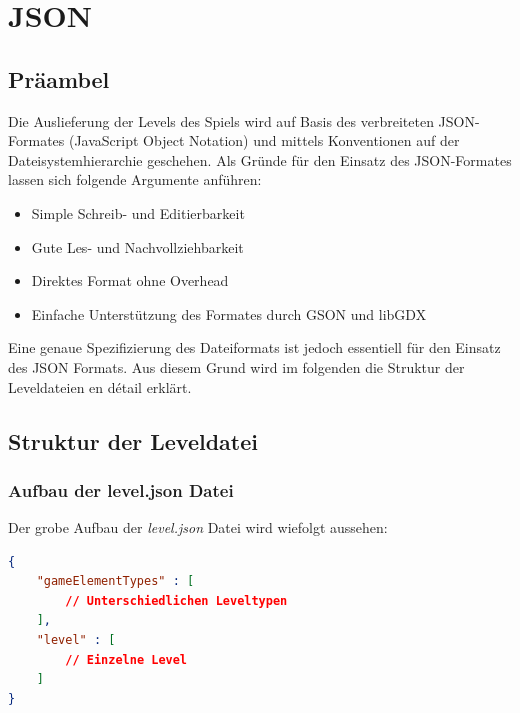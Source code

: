 \documentclass[11pt,a4paper]{report}
\begin{document}
\clearpage

\section{JSON}

\subsection{Präambel}

Die Auslieferung der Levels des Spiels wird auf Basis des verbreiteten JSON-Formates (JavaScript Object Notation) und mittels Konventionen auf der Dateisystemhierarchie geschehen. Als Gründe für den Einsatz des JSON-Formates lassen sich folgende Argumente anführen:

\begin{itemize}
	\item Simple Schreib- und Editierbarkeit
	\item Gute Les- und Nachvollziehbarkeit
	\item Direktes Format ohne Overhead
	\item Einfache Unterstützung des Formates durch GSON und libGDX
\end{itemize}

Eine genaue Spezifizierung des Dateiformats ist jedoch essentiell für den Einsatz des JSON Formats. Aus diesem Grund wird im folgenden die Struktur der Leveldateien en détail erklärt.

\subsection{Struktur der Leveldatei}

\begin{minipage}{1\textwidth}

\subsubsection{Aufbau der level.json Datei}

Der grobe Aufbau der \textit{level.json} Datei wird wiefolgt aussehen:

\begin{lstlisting}[language=json, firstnumber=1]
{
	"gameElementTypes" : [
		// Unterschiedlichen Leveltypen
	],
	"level" : [
		// Einzelne Level
	]
}
\end{lstlisting}

\end{minipage}
\end{document}
